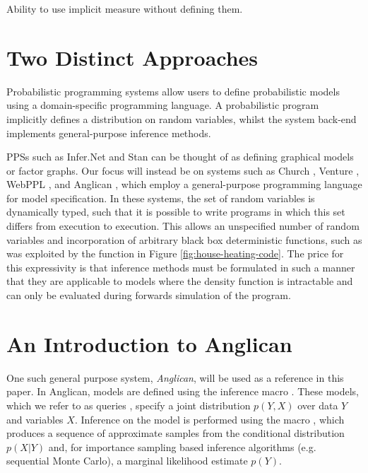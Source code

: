 


Ability to use implicit measure without defining them.

\section{Two Distinct Approaches}
\label{sec:probprog:two}

Probabilistic programming systems allow users to define probabilistic models using a domain-specific programming language. A probabilistic program implicitly defines a distribution on random variables, whilst the system back-end implements general-purpose inference methods.  

PPSs such as Infer.Net \citep{minka_software_2010} and Stan \citep{carpenter2015stan} can be thought of as defining graphical models or factor graphs.  Our focus will instead be on systems such as Church \citep{goodman_uai_2008}, Venture \citep{mansinghka2014venture}, WebPPL \citep{goodman_book_2014}, and Anglican \citep{wood2014new}, which employ a general-purpose programming language for model specification. In these systems, the set of random variables is dynamically typed, such that it is possible to write programs in which this set differs from execution to execution.  This allows an unspecified number of random variables and incorporation of arbitrary black box deterministic functions, such as was exploited by the \simulatec function in Figure \ref{fig:house-heating-code}. The price for this expressivity is that inference methods must be formulated in such a manner that they are applicable to models where the density function is intractable and can only be evaluated during forwards simulation of the program. 


\section{An Introduction to Anglican}
\label{sec:probprog:anglican}

One such general purpose system, \emph{Anglican}, will be used as a reference in this paper.  In Anglican, models are defined using the inference macro . These models, which we refer to as queries \citep{goodman_uai_2008}, specify a joint distribution $p(Y,X)$ over data $Y$ and variables $X$. Inference on the model is performed using the macro \doquery, which produces a sequence of approximate samples from the conditional distribution $p(X|Y)$ and, for importance sampling based inference algorithms (e.g. sequential Monte Carlo), a marginal likelihood estimate $p(Y)$.  

